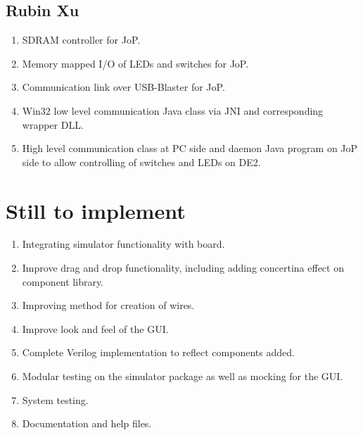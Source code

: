 \documentclass[12pt, a4paper, oneside,titlepage]{article}
\begin{document}
\subsection{Rubin Xu}
\begin{enumerate}
\item SDRAM controller for JoP.
\item Memory mapped I/O of LEDs and switches for JoP.
\item Communication link over USB-Blaster for JoP.
\item Win32 low level communication Java class via JNI and corresponding wrapper DLL.
\item High level communication class at PC side and daemon Java program on JoP side to allow controlling of switches and LEDs on DE2.
\end{enumerate}

\section{Still to implement}
\begin{enumerate}
\item Integrating simulator functionality with board.
\item Improve drag and drop functionality, including adding concertina effect on component library. 
\item Improving method for creation of wires. 
\item Improve look and feel of the GUI.
\item Complete Verilog implementation to reflect components added. 
\item Modular testing on the simulator package as well as mocking for the GUI. 
\item System testing. 
\item Documentation and help files. 
\end{enumerate}
\end{document}
